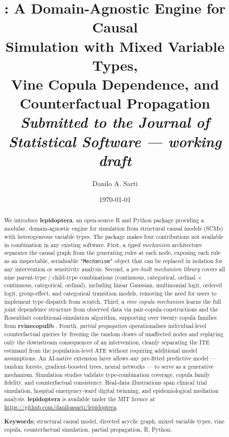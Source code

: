 \documentclass[12pt,a4paper]{article}
\title{%
  \textbf{\pkg{lepidoptera}: A Domain-Agnostic Engine for Causal\\
  Simulation with Mixed Variable Types,\\
  Vine Copula Dependence, and Counterfactual Propagation}\\[0.8em]
  \large\textit{Submitted to the Journal of Statistical Software --- working draft}
}
\author{%
  Danilo A. Sarti\\[0.3em]
  \small\email{daniloasarti@gmail.com}
}
\date{\today}
\newcommand{\pkg}[1]{\textbf{#1}}
\newcommand{\proglang}[1]{\textsf{#1}}
\newcommand{\class}[1]{\mbox{\texttt{"#1"}}}
\begin{document}
\maketitle

\begin{abstract}
\noindent
We introduce \pkg{lepidoptera}, an open-source \proglang{R} and \proglang{Python}
package providing a modular, domain-agnostic engine for simulation from structural
causal models (SCMs) with heterogeneous variable types. The package makes four
contributions not available in combination in any existing software. First, a
\emph{typed mechanism} architecture separates the causal graph from the generating
rules at each node, exposing each rule as an inspectable, serialisable
\class{Mechanism} object that can be replaced in isolation for any intervention or
sensitivity analysis. Second, a \emph{pre-built mechanism library} covers all nine
parent-type / child-type combinations (continuous, categorical, ordinal $\times$
continuous, categorical, ordinal), including linear Gaussian, multinomial logit,
ordered logit, group-effect, and categorical transition models, removing the need
for users to implement type dispatch from scratch. Third, a \emph{vine copula
mechanism} learns the full joint dependence structure from observed data via
pair-copula constructions and the Rosenblatt conditional-simulation algorithm,
supporting over twenty copula families from \pkg{rvinecopulib}
\citep{nagler2022rvinecopulib}. Fourth, \emph{partial propagation} operationalises
individual-level counterfactual queries by freezing the random draws of unaffected
nodes and replaying only the downstream consequences of an intervention, cleanly
separating the ITE estimand from the population-level ATE without requiring
additional model assumptions. An AI-native extension layer allows any pre-fitted
predictive model --- random forests, gradient-boosted trees, neural networks --- to
serve as a generative mechanism. Simulation studies validate type-combination
coverage, copula family fidelity, and counterfactual consistency. Real-data
illustrations span clinical trial simulation, hospital emergency-ward digital
twinning, and epidemiological mediation analysis. \pkg{lepidoptera} is available
under the MIT licence at \url{https://github.com/daniloasarti/lepidoptera}.

\medskip\noindent
\textbf{Keywords:} structural causal model, directed acyclic graph, mixed variable
types, vine copula, counterfactual simulation, partial propagation,
\proglang{R}, \proglang{Python}.
\end{abstract}
\end{document}
